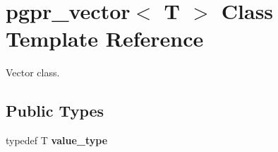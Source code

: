 \hypertarget{classpgpr__vector}{\section{pgpr\-\_\-vector$<$ T $>$ Class Template Reference}
\label{classpgpr__vector}
}


Vector class.  


\subsection*{Public Types}
\begin{DoxyCompactItemize}
\item 
\hypertarget{classpgpr__vector_ad23bca84220aeefcc7057b9b951e7b0e}{typedef T {\bfseries value\-\_\-type}}\label{classpgpr__vector_ad23bca84220aeefcc7057b9b951e7b0e}

\end{DoxyCompactItemize}
